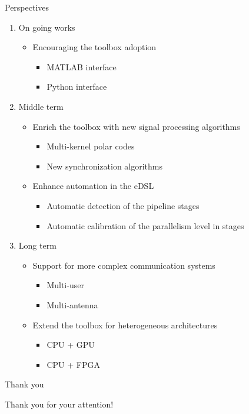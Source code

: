 \begin{frame}{Perspectives}
  \begin{enumerate}
    \item On going works
    \begin{itemize}
      \item Encouraging the toolbox adoption
      \begin{itemize}
        \item MATLAB interface
        \item Python interface
      \end{itemize}
    \end{itemize}
    \vspace{0.1cm}
    \pause
    \item Middle term
    \begin{itemize}
      \item Enrich the toolbox with new signal processing algorithms
      \begin{itemize}
        \item Multi-kernel polar codes
        \item New synchronization algorithms
      \end{itemize}
      \item Enhance automation in the eDSL
      \begin{itemize}
        \item Automatic detection of the pipeline stages
        \item Automatic calibration of the parallelism level in stages
      \end{itemize}
    \end{itemize}
    \vspace{0.1cm}
    \pause
    \item Long term
    \begin{itemize}
      \item Support for more complex communication systems
      \begin{itemize}
        \item Multi-user
        \item Multi-antenna
      \end{itemize}
      \item Extend the toolbox for heterogeneous architectures
      \begin{itemize}
        \item CPU + GPU
        \item CPU + FPGA
      \end{itemize}
    \end{itemize}
  \end{enumerate}
\end{frame}

\begin{frame}[c]{Thank you}
  \begin{center}
  {\Large Thank you for your attention!}
  \end{center}
\end{frame}
